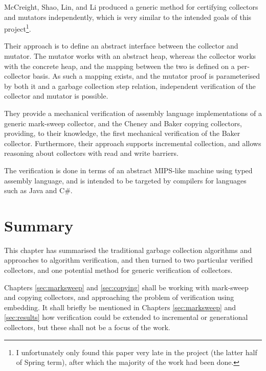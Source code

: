 McCreight, Shao, Lin, and Li\cite{McCreight07} produced a generic
method for certifying collectors and mutators independently, which is
very similar to the intended goals of this project\footnote{I
  unfortunately only found this paper very late in the project (the
  latter half of Spring term), after which the majority of the work
  had been done.}.

Their approach is to define an abstract interface between the
collector and mutator. The mutator works with an abstract heap,
whereas the collector works with the concrete heap, and the mapping
between the two is defined on a per-collector basis. As such a mapping
exists, and the mutator proof is parameterised by both it and a
garbage collection step relation, independent verification of the
collector and mutator is possible.

They provide a mechanical verification of assembly language
implementations of a generic mark-sweep collector, and the Cheney and
Baker copying collectors, providing, to their knowledge, the first
mechanical verification of the Baker collector. Furthermore, their
approach supports incremental collection, and allows reasoning about
collectors with read and write barriers.

The verification is done in terms of an abstract MIPS-like machine
using typed assembly language, and is intended to be targeted by
compilers for languages such as Java and C\#.

\section{Summary}
\label{sec:lit-summary}

This chapter has summarised the traditional garbage collection
algorithms and approaches to algorithm verification, and then turned
to two particular verified collectors, and one potential method for
generic verification of collectors.

Chapters \ref{sec:marksweep} and \ref{sec:copying} shall be working
with mark-sweep and copying collectors, and approaching the problem of
verification using embedding. It shall briefly be mentioned in
Chapters \ref{sec:marksweep} and \ref{sec:results} how verification could
be extended to incremental or generational collectors, but these shall
not be a focus of the work.
